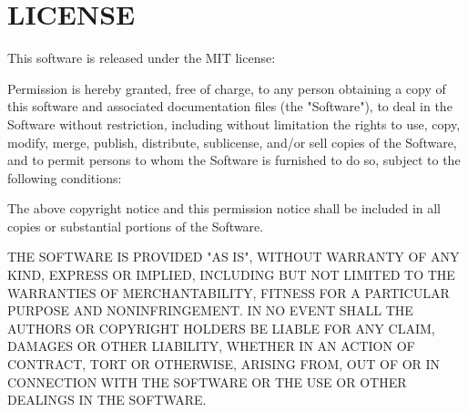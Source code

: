 \chapter{LICENSE}
\hypertarget{md_pkiclassroomrescheduler_2src_2main_2frontend_2node__modules_2is-typedarray_2_l_i_c_e_n_s_e}{}\label{md_pkiclassroomrescheduler_2src_2main_2frontend_2node__modules_2is-typedarray_2_l_i_c_e_n_s_e}
This software is released under the MIT license\+:

Permission is hereby granted, free of charge, to any person obtaining a copy of this software and associated documentation files (the "{}\+Software"{}), to deal in the Software without restriction, including without limitation the rights to use, copy, modify, merge, publish, distribute, sublicense, and/or sell copies of the Software, and to permit persons to whom the Software is furnished to do so, subject to the following conditions\+:

The above copyright notice and this permission notice shall be included in all copies or substantial portions of the Software.

THE SOFTWARE IS PROVIDED "{}\+AS IS"{}, WITHOUT WARRANTY OF ANY KIND, EXPRESS OR IMPLIED, INCLUDING BUT NOT LIMITED TO THE WARRANTIES OF MERCHANTABILITY, FITNESS FOR A PARTICULAR PURPOSE AND NONINFRINGEMENT. IN NO EVENT SHALL THE AUTHORS OR COPYRIGHT HOLDERS BE LIABLE FOR ANY CLAIM, DAMAGES OR OTHER LIABILITY, WHETHER IN AN ACTION OF CONTRACT, TORT OR OTHERWISE, ARISING FROM, OUT OF OR IN CONNECTION WITH THE SOFTWARE OR THE USE OR OTHER DEALINGS IN THE SOFTWARE. 
